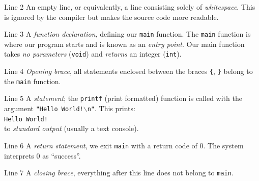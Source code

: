 \documentclass[table]{beamer}
\newif\ifschigh\schighfalse
\newcommand{\kw}[1]{\ifschigh\textcolor{red}{#1}\else\textcolor{keyword}{#1}\fi}
\newcommand{\kt}[1]{\ifschigh\textcolor{red}{#1}\else\textcolor{ctext}{#1}\fi}
\begin{document}
\begin{frame}
\begin{block}{Line 2}
An empty line, or equivalently, a line consisting solely of \emph{whitespace}. This is ignored by the compiler but makes the source code more readable.\end{block}

\begin{block}{Line 3}
A \emph{function declaration}, defining our {\tt main} function. The
{\tt main} function is where our program starts and is known as an
\emph{entry point}. Our main function takes \emph{no parameters} (\kw{\tt void}) and \emph{returns} an integer (\kw{\tt int}).
\end{block}

\begin{block}{Line 4}
\emph{Opening brace}, all statements enclosed between the braces {\tt\{}, {\tt\}} belong to the {\tt main} function.
\end{block}

\end{frame}

\begin{frame}
\begin{block}{Line 5}
A \emph{statement}; the \kw{\tt printf} (print formatted) function is called with the argument \kt{\tt "Hello World!$\backslash$n"}. This prints:\\
{\tt Hello World!}\\
to \emph{standard output} (usually a text console).
\end{block}

\begin{block}{Line 6}
A \emph{return statement}, we exit {\tt main} with a return code of 0. The system interprets 0 as ``success''.
\end{block}


\begin{block}{Line 7}
A \emph{closing brace}, everything after this line does not belong to
{\tt main}.
\end{block}

\end{frame}
\end{document}
